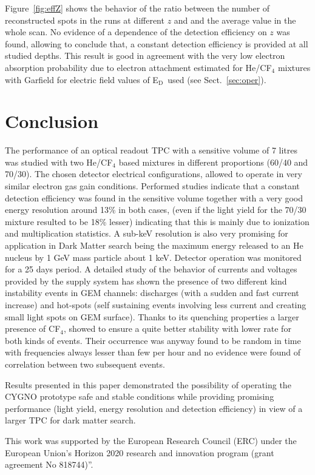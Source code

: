 \documentclass[a4paper,11pt]{article}
\newcommand{\Ed}  {E$_{\mathrm{D}}$}
\begin{document}
Figure~\ref{fig:effZ} shows the behavior of the ratio between the number of reconstructed spots in the runs at different $z$ and and the average value in the whole scan.  
No evidence of a dependence of the detection efficiency on $z$ was found, allowing to conclude that, a constant detection efficiency is provided at all studied depths. This result is good in agreement with the very low electron absorption probability due to electron attachment estimated for He/CF$_4$  mixtures with Garfield for electric field values of \Ed\ used (see Sect.~\ref{sec:oper}). 


\section{Conclusion}

The performance of an optical readout TPC with a sensitive volume of 7 litres was studied with two He/CF$_4$ based mixtures in different proportions (60/40 and 70/30).
The chosen detector electrical configurations, allowed to operate in very similar electron gas gain conditions.
Performed studies indicate that a constant detection efficiency was found in the sensitive volume 
together with a very good energy resolution around 13\% in both cases,
(even if the light yield for the 70/30 mixture resulted to be 18\% lesser) indicating that this is mainly due to ionization and multiplication statistics.
A sub-keV resolution is also very promising for application in Dark Matter search being the maximum energy released to an He nucleus by 1 GeV mass particle about 1 keV. 
Detector operation was monitored for a 25 days period. A detailed study of the behavior of currents and voltages provided by the supply system has shown the presence of two different kind instability events in GEM channels: discharges (with a sudden and fast current increase) and hot-spots (self sustaining events involving less current and creating small light spots on GEM surface).
Thanks to its quenching properties a larger presence of CF$_4$, showed to ensure a quite better stability with lower rate for both kinds of events.
Their occurrence was anyway found to be random in time with frequencies always lesser than few per hour and no evidence were found of correlation between two subsequent events.

Results presented in this paper demonstrated the possibility of operating the CYGNO prototype safe and stable conditions while providing promising performance (light yield, energy resolution and detection efficiency) in view of a larger TPC for dark matter search. 

\acknowledgments 
This work was supported by the European Research Council (ERC) under the European Union’s Horizon 2020 research and innovation program (grant agreement No 818744)”.



\end{document}

